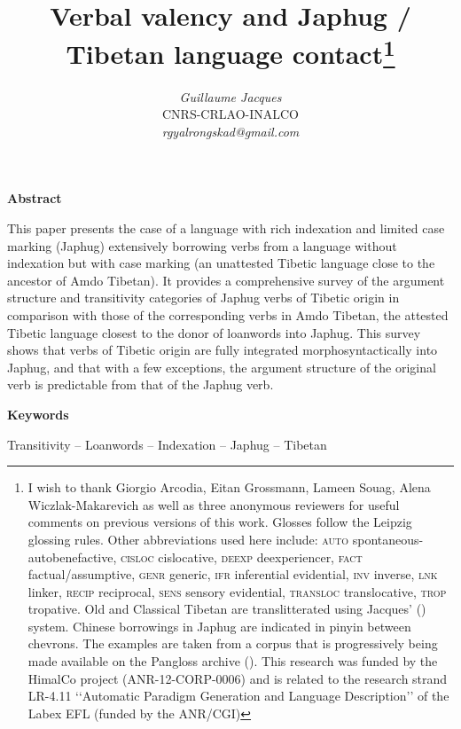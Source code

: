 \documentclass[oneside,a4paper,11pt]{article}
\begin{document}
 
\title{Verbal valency and Japhug / Tibetan language contact\footnote{I wish to thank Giorgio Arcodia, Eitan Grossmann, Lameen Souag, Alena Wiczlak-Makarevich as well as three anonymous reviewers for useful comments on previous versions of this work. Glosses follow the Leipzig glossing rules. Other abbreviations used here include: \textsc{auto} spontaneous-autobenefactive, \textsc{cisloc} cislocative,  \textsc{deexp} deexperiencer, \textsc{fact} factual/assumptive, \textsc{genr} generic, \textsc{ifr} inferential evidential,  \textsc{inv} inverse, \textsc{lnk} linker, \textsc{recip} reciprocal, \textsc{sens} sensory  evidential, \textsc{transloc} translocative, \textsc{trop} tropative.  Old and Classical Tibetan are translitterated using Jacques' (\citeyear{jacques12transcription}) system.  Chinese borrowings in Japhug are indicated in pinyin between chevrons. The examples are taken from a corpus that is progressively being made available on the Pangloss archive (\citealt{michailovsky14pangloss}). This research was funded by the HimalCo project (ANR-12-CORP-0006) and is related to the research strand LR-4.11 ‘‘Automatic Paradigm Generation and Language Description’’ of the Labex EFL (funded by the ANR/CGI) }} 
\author{\textit{Guillaume Jacques}\\CNRS-CRLAO-INALCO\\\textit{rgyalrongskad@gmail.com}}
\date{}
\maketitle 

\textbf{Abstract}

\noindent
This paper presents the case of a language with rich indexation and limited case marking (Japhug) extensively borrowing verbs from a language without indexation but with case marking (an unattested Tibetic language close to the ancestor of Amdo Tibetan). It provides a comprehensive survey of the argument structure and transitivity categories of Japhug verbs of Tibetic origin in comparison with those of the corresponding verbs in Amdo Tibetan, the attested Tibetic language closest to the donor of loanwords into Japhug. This survey shows that verbs of Tibetic origin are fully integrated morphosyntactically into Japhug, and that with a few exceptions, the argument structure of the original verb is predictable from that of the Japhug verb.

\textbf{Keywords}

\noindent
Transitivity -- Loanwords -- Indexation -- Japhug -- Tibetan
\end{document}
